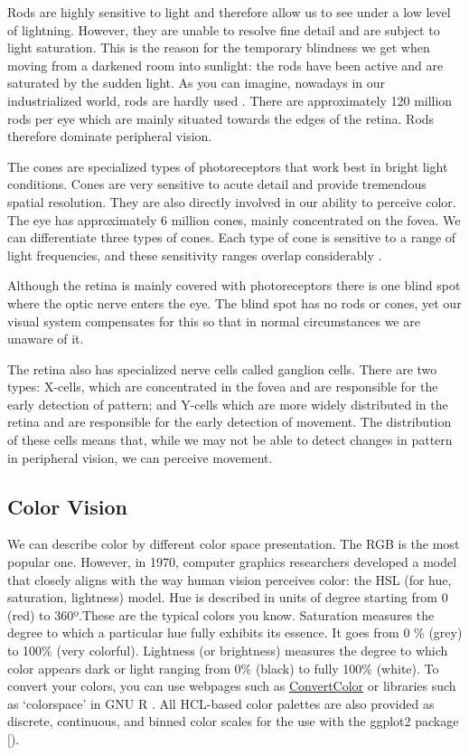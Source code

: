 \documentclass[
]{book}
\begin{document}
Rods are highly sensitive to light and therefore allow us to see under a low level of lightning. However, they are unable to resolve fine detail and are subject to light saturation. This is the reason for the temporary blindness we get when moving from a darkened room into sunlight: the rods have been active and are saturated by the sudden light. As you can imagine, nowadays in our industrialized world, rods are hardly used \citep{Johnson2014designingwiththemind}. There are approximately 120 million rods per eye which are mainly situated towards the edges of the retina. Rods therefore dominate peripheral vision.

The cones are specialized types of photoreceptors that work best in bright light conditions. Cones are very sensitive to acute detail and provide tremendous spatial resolution. They are also directly involved in our ability to perceive color. The eye has approximately 6 million cones, mainly concentrated on the fovea. We can differentiate three types of cones. Each type of cone is sensitive to a range of light frequencies, and these sensitivity ranges overlap considerably \citep{Johnson2014designingwiththemind}.

Although the retina is mainly covered with photoreceptors there is one blind spot where the optic nerve enters the eye. The blind spot has no rods or cones, yet our visual system compensates for this so that in normal circumstances we are unaware of it.

The retina also has specialized nerve cells called ganglion cells. There are two types: X-cells, which are concentrated in the fovea and are responsible for the early detection of pattern; and Y-cells which are more widely distributed in the retina and are responsible for the early detection of movement. The distribution of these cells means that, while we may not be able to detect changes in pattern in peripheral vision, we can perceive movement.

\hypertarget{color-vision}{%
\subsection{Color Vision}\label{color-vision}}

We can describe color by different color space presentation. The RGB is the most popular one. However, in 1970, computer graphics researchers developed a model that closely aligns with the way human vision perceives color: the HSL (for hue, saturation, lightness) model. Hue is described in units of degree starting from 0 (red) to 360º.These are the typical colors you know. Saturation measures the degree to which a particular hue fully exhibits its essence. It goes from 0 \% (grey) to 100\% (very colorful). Lightness (or brightness) measures the degree to which color appears dark or light ranging from 0\% (black) to fully 100\% (white). To convert your colors, you can use webpages such as \href{https://convertacolor.com/}{ConvertColor} or libraries such as `colorspace' in GNU R \citep{Zeileisetal2019colorspace}. All HCL-based color palettes are also provided as discrete, continuous, and binned color scales for the use with the ggplot2 package {[}\citet{Wickham2016ggplot2}).
\end{document}
